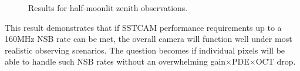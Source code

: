 \begin{figure}[ht]
\begin{minipage}{\linewidth}\centering
{}

\caption{Results for half-moonlit zenith observations.}

\end{minipage}
\label{fig:hm}
\end{figure}
This result demonstrates that if SSTCAM performance requirements up to a 160MHz NSB rate can be met, the overall camera will function well under most realistic observing scenarios. The question becomes if individual pixels will be able to handle such NSB rates without an overwhelming gain$\times$PDE$\times$OCT drop.

